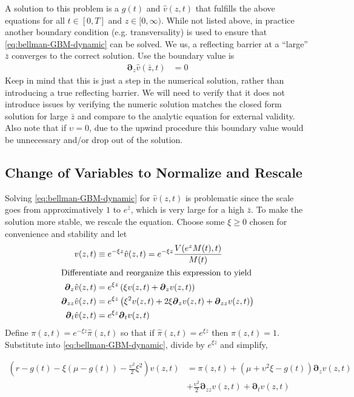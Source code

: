 \documentclass[11pt]{article}
\newcommand{\D}[1][]{\ensuremath{\boldsymbol{\partial}_{#1}}}
\begin{document}
A solution to this problem is a $g(t)$ and $\hat{v}(z,t)$ that fulfills the above equations for all $t\in[0,T]$ and $z\in[0,\infty)$.  While not listed above, in practice another boundary condition (e.g. transversality) is used to ensure that \cref{eq:bellman-GBM-dynamic} can be solved. We us, a reflecting barrier at a ``large'' $\bar{z}$ converges to the correct solution.  Use the boundary value is
	\begin{align}
	\D[z]\hat{v}(\bar{z},t) &= 0\label{eq:reflecting-GBM-dynamic}
	\end{align}
	Keep in mind that this is just a step in the numerical solution, rather than introducing a true reflecting barrier.  We will need to verify that it does not introduce issues by verifying the numeric solution matches the closed form solution for large $\bar{z}$ and compare to the analytic equation for external validity.  Also note that if $\upsilon = 0$, due to the upwind procedure this boundary value would be unnecessary and/or drop out of the solution.

\subsection{Change of Variables to Normalize and Rescale}\label{eq:simple-rescale}
Solving \cref{eq:bellman-GBM-dynamic} for $\hat{v}(z,t)$ is problematic since the scale goes from approximatively $1$ to $e^{\bar{z}}$, which is very large for a high $\bar{z}$.  To make the solution more stable, we rescale the equation.  Choose some $\xi \geq 0$ chosen for convenience and stability and let
\begin{align}
	v(z,t) &\equiv e^{-\xi z}\hat{v}(z,t) = e^{-\xi z}\frac{V(e^z M(t),t)}{M(t)}\\
	\intertext{Differentiate and reorganize this expression to yield}
	\D[z]\hat{v}(z,t) &= e^{\xi z}\left(\xi v(z,t) + \D[z]v(z,t) \right)\\
	\D[zz]\hat{v}(z,t) &= e^{\xi z}\left(\xi^{2} v(z,t) + 2 \xi\D[z]v(z,t) + \D[zz]v(z,t)  \right)\\	
	\D[t]\hat{v}(z,t) &= e^{\xi z} \D[t]v(z,t)
\end{align}
Define $\pi(z,t) = e^{-\xi z}\hat{\pi}(z,t)$ so that if $\hat{\pi}(z,t) = e^{\xi z}$ then $\pi(z,t) = 1$.  Substitute into \cref{eq:bellman-GBM-dynamic}, divide by $e^{\xi z}$ and simplify,

\begin{align}
	\left(r - g(t)- \xi(\mu-g(t)) - \frac{\upsilon^2}{2}\xi^2\right)  v(z,t) &= \pi(z,t) + (\mu+ \upsilon^2\xi - g(t)) \D[z]v(z,t) \nonumber \\ &+ \frac{\upsilon^2}{2} \D[zz]v(z,t) + \D[t]v(z,t)  \label{eq:bellman-GBM-dynamic-normalized}
\end{align}
\end{document}
